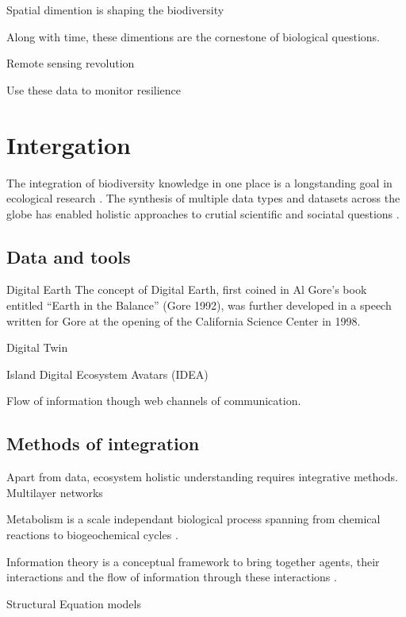 Spatial dimention is shaping the biodiversity

Along with time, these dimentions are the cornestone of 
biological questions. 


Remote sensing revolution

Use these data to monitor resilience \citep{Lenton2022resilience}

\section{Intergation}
\label{sec:crete-integration}

The integration of biodiversity knowledge in one place is a longstanding
goal in ecological research \citep{Walter_2012}. The synthesis of multiple
data types and datasets across the globe has enabled 
holistic approaches to crutial scientific and sociatal questions \citep{heberling_j_mason_data_2021}.

\subsection{Data and tools}
\label{sec:data-tools}

Digital Earth
The concept of Digital Earth, first coined in Al Gore’s book entitled 
“Earth in the Balance” (Gore 1992), was further developed in a speech
written for Gore at the opening of the California Science Center in 1998.

Digital Twin

Island Digital Ecosystem Avatars (IDEA)

Flow of information though web channels of communication.

\subsection{Methods of integration}
\label{sec:meth-int}

Apart from data, ecosystem holistic understanding requires integrative methods.
Multilayer networks \citep{marine-multilayers}

Metabolism is a scale independant biological process spanning from chemical reactions
to biogeochemical cycles \citep{hall2018understanding}. 

Information theory is a conceptual framework to bring together agents,
their interactions and the flow of information through these interactions \citep{oconnor-information-ecology}.

Structural Equation models

